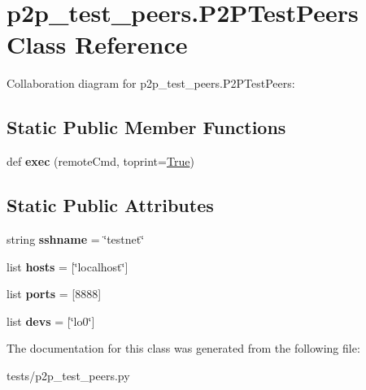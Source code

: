 \hypertarget{classp2p__test__peers_1_1_p2_p_test_peers}{}\section{p2p\+\_\+test\+\_\+peers.\+P2\+P\+Test\+Peers Class Reference}
\label{classp2p__test__peers_1_1_p2_p_test_peers}


Collaboration diagram for p2p\+\_\+test\+\_\+peers.\+P2\+P\+Test\+Peers\+:
\subsection*{Static Public Member Functions}
\begin{DoxyCompactItemize}
\item 
\mbox{\label{classp2p__test__peers_1_1_p2_p_test_peers_a1fcc7d8d05cdd8c4f802cd821d6b8831}} 
def {\bfseries exec} (remote\+Cmd, toprint=\mbox{\hyperlink{struct_true}{True}})
\end{DoxyCompactItemize}
\subsection*{Static Public Attributes}
\begin{DoxyCompactItemize}
\item 
\mbox{\label{classp2p__test__peers_1_1_p2_p_test_peers_abe26854befa6d6174634ad67b0d63846}} 
string {\bfseries sshname} = \char`\"{}testnet\char`\"{}
\item 
\mbox{\label{classp2p__test__peers_1_1_p2_p_test_peers_ac9035193d517818500333167a93b92b3}} 
list {\bfseries hosts} = \mbox{[}\char`\"{}localhost\char`\"{}\mbox{]}
\item 
\mbox{\label{classp2p__test__peers_1_1_p2_p_test_peers_a75e26d331f0dafaa0378c84ce92495d7}} 
list {\bfseries ports} = \mbox{[}8888\mbox{]}
\item 
\mbox{\label{classp2p__test__peers_1_1_p2_p_test_peers_acd36c96c97c9dd7a89a67d082a10229c}} 
list {\bfseries devs} = \mbox{[}\char`\"{}lo0\char`\"{}\mbox{]}
\end{DoxyCompactItemize}


The documentation for this class was generated from the following file\+:\begin{DoxyCompactItemize}
\item 
tests/p2p\+\_\+test\+\_\+peers.\+py\end{DoxyCompactItemize}
